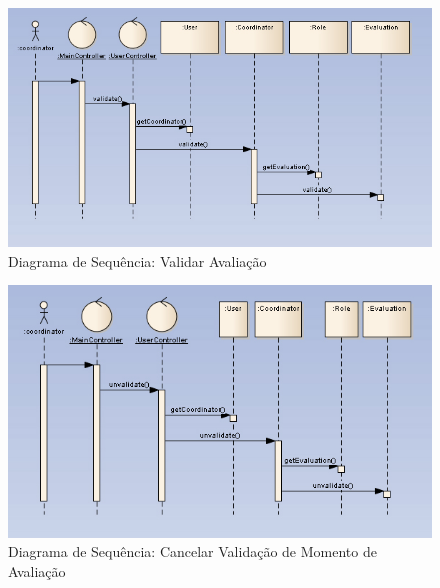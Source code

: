 \begin{figure}[!htbp]
\centering
\includegraphics{imagens/validar_momento_de_avaliacao.jpg}
\caption{Diagrama de Sequência: Validar Avaliação}
\label{fig:validar_avaliacao}
\end{figure}

\begin{figure}[!htbp]
\centering
\includegraphics{imagens/cancelar_validacao.jpg}
\caption{Diagrama de Sequência: Cancelar Validação de Momento de Avaliação}
\label{fig:cancelar_validacao}
\end{figure}